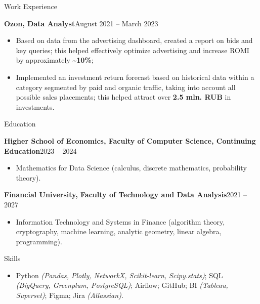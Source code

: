 \documentclass[]{mcdowellcv}
\renewenvironment{cvsubsection}[2]{%
  \begin{adjustwidth}{\subsectionmargin}{\subsectionmargin}%
    {\bfseries #1}\hfill #2\par\vspace{0.5em}%
}{%
  \end{adjustwidth}%
  \vspace*{\aftersubsectionspace}%
}
\begin{document}
\begin{cvsection}{\Large Work Experience}
		\begin{cvsubsection}{Ozon, Data Analyst}{August 2021 -- March 2023}
			\begin{itemize}
				\item Based on data from the advertising dashboard, created a report on bids and key queries; this helped effectively optimize advertising and increase ROMI by approximately \textbf{\textasciitilde 10\%};
				\item Implemented an investment return forecast based on historical data within a category segmented by paid and organic traffic, taking into account all possible sales placements; this helped attract over \textbf{2.5 mln. RUB} in investments.
			\end{itemize}
		\end{cvsubsection}
	\end{cvsection}
	
	\begin{cvsection}{\Large Education}
		\begin{cvsubsection}{Higher School of Economics, Faculty of Computer Science, Continuing Education}{2023 -- 2024}
			\begin{itemize}
				\item Mathematics for Data Science (calculus, discrete mathematics, probability theory).
			\end{itemize}
		\end{cvsubsection}
		\begin{cvsubsection}{Financial University, Faculty of Technology and Data Analysis}{2021 -- 2027}
			\begin{itemize}
				\item Information Technology and Systems in Finance (algorithm theory, cryptography, machine learning, analytic geometry, linear algebra, programming).
			\end{itemize}
		\end{cvsubsection}
	\end{cvsection}
	
	\begin{cvsection}{\Large Skills}
		\begin{cvsubsection}{}{}{}	
			\begin{itemize}
				\item Python \textit{(Pandas, Plotly, NetworkX, Scikit-learn, Scipy.stats)}; SQL \textit{(BigQuery, Greenplum, PostgreSQL)}; Airflow; GitHub; BI \textit{(Tableau, Superset)}; Figma; Jira \textit{(Atlassian)}. 
			\end{itemize}
		\end{cvsubsection}
	\end{cvsection}
	
\end{document}
